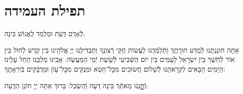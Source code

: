 \documentclass[twoside, openany, parskip=half, 11pt]{book}
\begin{document}
\boruchhashemleolam

\yerueinnu

\halfkaddish

\section*{ תפילת העמידה }


\amidaopening{\ayt}{}

לְֿאָדָם דַּֽעַת וּמְלַמֵּד לֶאֱנוֹשׁ בִּינָה.
\begin{narrow}
אַתָּה חוֹנַנְתָּֽנוּ לְֿמַדַּע תּוֹרָתֶֽךָ וַתְּֿלַמְּֿדֵֽנוּ לַעֲשׂוֹת חֻקֵּי רְֿצוֹנֶֽךָ וַתַּבְדִּילֵֽנוּ יְיָ אֱלֹהֵֽינוּ בֵּין קֹֽדֶשׁ לְֿחוֹל בֵּין אוֹר לְֿחֹֽשֶׁךְ בֵּין יִשְׂרָאֵל לָעַמִּים בֵּין יוֹם הַשְּֿׁבִיעִי לְֿשֵֽׁשֶׁת יְֿמֵי הַמַּעֲשֶׂה: אָבִֽינוּ מַלְכֵּֽנוּ הָחֵל עָלֵֽינוּ הַיָּמִים הַבָּאִים לִקְרָאתֵֽנוּ לְֿשָׁלוֹם חֲשׂוּכִים מִכׇּל־חֵטְא וּמְנֻקִּים מִכׇּל־עָוֹן וּמְדֻבָּקִים בְּֿיִרְאָתֶֽךָ:\\
\end{narrow}
וְֿחׇׇׇׇׇׇׇׇָנֵּֽנוּ מֵאִתְּֿךָ בִּינָה דֵּעָה וְֿהַשְׂכֵּל: בָּרוּךְ אַתָּה יְיָ חוֹנֵן הַדָּֽעַת:

\weekdaysateshuva

\weekdaysaselichah

\weekdaysageulah

\weekdaysarefuah

\weekdaysaberacha

\weekdaysashofar

\weekdaysamishpat

\weekdaysaminim

\weekdaysatzadikim

\weekdaysayerushelayim

\weekdaysamalchus

\weekdaysashemakoleinu

\retzeh

\clearpage

\vspace{-\baselineskip}
\yaalehveyavo

\zion

\newcommand{\maarivmodim}{
\firstword{מוֹדִים}
אֲנַֽחְנוּ לָךְ שָׁאַתָּה הוּא יְיָ אֱלֹהֵֽינוּ וֵאלֹהֵי אֲבוֹתֵֽינוּ לְֿעוֹלָם וָעֶד צוּר חַיֵּֽינוּ מָגֵן יִשְׁעֵֽנוּ אַתָּה הוּא לְֿדוֹר וָדוֹר: נוֹדֶה לְּֿךָ וּנְסַפֵּר תְּֿהִלָּתֶֽךָ עַל חַיֵּֽינוּ הַמְּֿסוּרִים בְּֿיָדֶֽךָ וְֿעַל נִשְׁמוֹתֵֽינוּ הַפְּֿקוּדוֹת לָךְ וְֿעַל נִסֶּֽיךָ שֶׁבְּֿכׇל־יוֹם עִמָּֽנוּ וְֿעַל נִפְלְֿאוֹתֶֽיךָ וְֿטוֹבוֹתֶֽיךָ שֶׁבְּֿכׇל־עֵת עֶֽרֶב וָבֹֽקֶר וְֿצׇׇׇׇׇׇׇׇׇׇׇׇׇׇׇׇָהֳרָֽיִם: הַטּוֹב כִּי לֹא כָלוּ רַחֲמֶֽיךָ וְֿהַמְֿרַחֵם כִּי לֹא תַֽמּוּ חֲסָדֶֽיךָ מֵעוֹלָם קִוִֽינוּ לָךְ:
}
\end{document}
